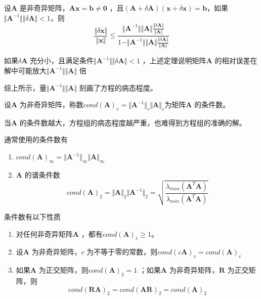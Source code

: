 \documentclass[a4paper]{article}
\begin{document}
\begin{theorem}
	设$\mathbf{A}$ 是非奇异矩阵，$\mathbf{Ax} = \mathbf{b} \neq \mathbf{0}$ ，且$(\mathbf{A} + \delta \mathbf{A}) (\mathbf{x} + \delta \mathbf{x}) = \mathbf{b}$，如果$\Vert \mathbf{A}^{-1} \Vert \Vert \delta \mathbf{A} \Vert < 1$，则
	\[
	\frac{\Vert \delta \mathbf{x} \Vert}{\Vert \mathbf{x} \Vert} \le \frac{\Vert \mathbf{A}^{-1} \Vert \Vert \mathbf{A} \Vert \frac{\Vert \delta \mathbf{A} \Vert}{\Vert \mathbf{A} \Vert}}{1 - \Vert \mathbf{A}^{-1} \Vert \Vert \mathbf{A} \Vert \frac{\Vert \delta \mathbf{A} \Vert}{\Vert \mathbf{A} \Vert}}
	\] 
\end{theorem}
如果$\delta \mathbf{A}$ 充分小，且满足条件$\Vert \mathbf{A}^{-1} \Vert \Vert \delta \mathbf{A} \Vert < 1$ ，上述定理说明矩阵$\mathbf{A}$ 的相对误差在解中可能放大$\Vert \mathbf{A}^{-1} \Vert \Vert \mathbf{A} \Vert$ 倍

综上所示，量$\Vert \mathbf{A}^{-1} \Vert \Vert \mathbf{A} \Vert$ 刻画了方程的病态程度。

\begin{definition}
	设$\mathbf{A}$ 为非奇异矩阵，称数$cond(\mathbf{A})_v = \Vert \mathbf{A}^{-1} \Vert_v \Vert \mathbf{A} \Vert_v$为矩阵$\mathbf{A}$ 的条件数。
\end{definition}

当$\mathbf{A}$ 的条件数越大，方程组的病态程度越严重，也难得到方程组的准确的解。

通常使用的条件数有
\begin{enumerate}
	\item $cond(\mathbf{A})_\infty = \Vert \mathbf{A}^{-1} \Vert_\infty \Vert \mathbf{A} \Vert_\infty$
	\item $\mathbf{A}$ 的谱条件数
		\[
			cond(\mathbf{A})_2 = \Vert \mathbf{A} \Vert_2 \Vert \mathbf{A}^{-1} \Vert_2 = \sqrt{\frac{\lambda_{max}(\mathbf{A}^{T}\mathbf{A})}{\lambda_{min}(\mathbf{A}^{T}\mathbf{A})}} 
		\] 
\end{enumerate}

条件数有以下性质
\begin{enumerate}
	\item 对任何非奇异矩阵$\mathbf{A}$ ，都有$cond(\mathbf{A})_v \ge 1$。
	\item 设$\mathbf{A}$ 为非奇异矩阵，$c$ 为不等于零的常数，则$cond(c \mathbf{A})_v = cond(\mathbf{A})_v$
	\item 如果$\mathbf{A}$ 为正交矩阵，则$cond(\mathbf{A})_2 = 1$ ；如果$\mathbf{A}$ 为非奇异矩阵，$\mathbf{R}$ 为正交矩阵，则
		\[
		cond(\mathbf{RA})_2 = cond(\mathbf{AR})_2 = cond(\mathbf{A})_2
		\] 
\end{enumerate}
\end{document}
